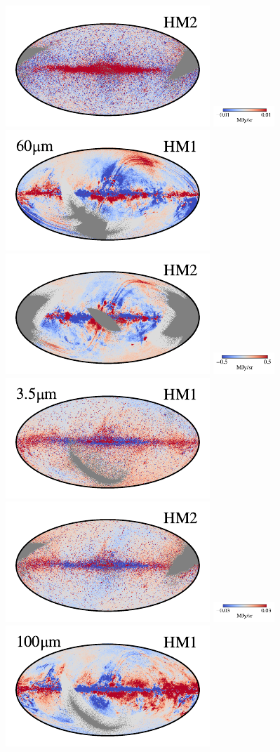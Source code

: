 \documentclass[twocolumn]{aa}
\begin{document}
\begin{figure}[t]
    \includegraphics[width=0.22\linewidth]{figs/compare_res/cosmoglobe_res_02b.pdf}%
    \includegraphics[width=23mm,angle=90]{figs/compare_res/cbar_02.pdf}\hspace*{3mm}
    \includegraphics[width=0.22\linewidth]{figs/compare_res/cosmoglobe_res_07a.pdf}%
    \includegraphics[width=0.22\linewidth]{figs/compare_res/cosmoglobe_res_07b.pdf}%
    \includegraphics[width=23mm,angle=90]{figs/compare_res/cbar_07.pdf}\\
    \includegraphics[width=0.22\linewidth]{figs/compare_res/cosmoglobe_res_03a.pdf}%
    \includegraphics[width=0.22\linewidth]{figs/compare_res/cosmoglobe_res_03b.pdf}%
    \includegraphics[width=23mm,angle=90]{figs/compare_res/cbar_03.pdf}\hspace*{3mm}
    \includegraphics[width=0.22\linewidth]{figs/compare_res/cosmoglobe_res_08a.pdf}%

\end{figure}
\end{document}
